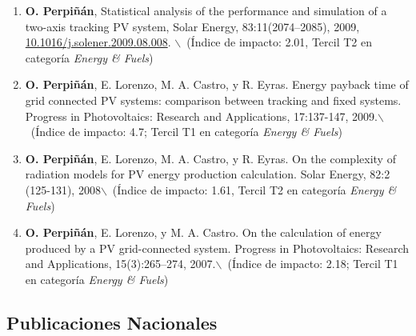 \documentclass[article, a4paper]{memoir}
\begin{document}
\begin{enumerate}
\item \textbf{O. Perpiñán}, Statistical analysis of the performance and simulation of a two-axis tracking PV system, Solar Energy, 83:11(2074–2085), 2009, \href{http://dx.doi.org/10.1016/j.solener.2009.08.008}{10.1016/j.solener.2009.08.008}. $\backslash$\ (Índice de impacto: 2.01, Tercil T2 en categoría \emph{Energy \& Fuels})

\item \textbf{O. Perpiñán}, E. Lorenzo, M. A. Castro, y R. Eyras. Energy payback time of grid connected PV systems: comparison between tracking and fixed systems. Progress in Photovoltaics: Research and Applications, 17:137-147, 2009.$\backslash$\ (Índice de impacto: 4.7; Tercil T1 en categoría \emph{Energy \& Fuels})

\item \textbf{O. Perpiñán}, E. Lorenzo, M. A. Castro, y R. Eyras. On the complexity of radiation models for PV energy production calculation. Solar Energy, 82:2 (125-131), 2008$\backslash$\ (Índice de impacto: 1.61, Tercil T2 en categoría \emph{Energy \& Fuels})

\item \textbf{O. Perpiñán}, E. Lorenzo, y M. A. Castro. On the calculation of energy produced by a PV grid-connected system. Progress in Photovoltaics: Research and Applications, 15(3):265–274, 2007.$\backslash$\ (Índice de impacto: 2.18; Tercil T1 en categoría \emph{Energy \& Fuels})
\end{enumerate}

\subsection{Publicaciones Nacionales}
\label{sec:orgd92f813}
\end{document}
